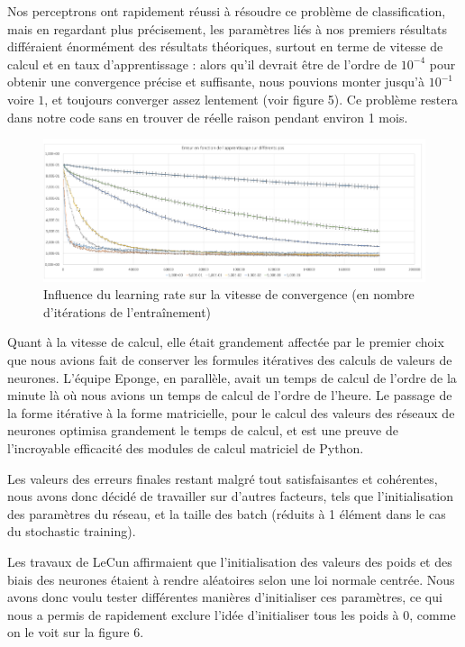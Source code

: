 \documentclass[
    10pt,
    a4paper,
    oneside,
    headinclude,footinclude,
    BCOR=5mm,
    captions=tableabove
]{scrartcl}
\begin{document}
Nos perceptrons ont rapidement réussi à résoudre ce problème de classification, mais en regardant plus précisement, les paramètres liés à nos premiers résultats différaient énormément des résultats théoriques, surtout en terme de vitesse de calcul et en taux d'apprentissage : alors qu'il devrait être de l'ordre de $10^{-4}$ pour obtenir une convergence précise et suffisante, nous pouvions monter jusqu'à $10^{-1}$ voire $1$, et toujours converger assez lentement (voir figure 5). Ce problème restera dans notre code sans en trouver de réelle raison pendant environ 1 mois.

\begin{figure}[h!]
\includegraphics[width=\linewidth]{errorRate.png}
\centering
\caption{Influence du learning rate sur la vitesse de convergence (en nombre d'itérations de l'entraînement) }
\label{fig:errorRate.png}
\end{figure}

Quant à la vitesse de calcul, elle était grandement affectée par le premier choix que nous avions fait de conserver les formules itératives des calculs de valeurs de neurones. L'équipe Eponge, en parallèle, avait un temps de calcul de l'ordre de la minute là où nous avions un temps de calcul de l'ordre de l'heure. Le passage de la forme itérative à la forme matricielle, pour le calcul des valeurs des réseaux de neurones optimisa grandement le temps de calcul, et est une preuve de l'incroyable efficacité des modules de calcul matriciel de Python. 

Les valeurs des erreurs finales restant malgré tout satisfaisantes et cohérentes, nous avons donc décidé de travailler sur d'autres facteurs, tels que l'initialisation des paramètres du réseau, et la taille des batch (réduits à 1 élément dans le cas du stochastic training).

Les travaux de LeCun affirmaient que l'initialisation des valeurs des poids et des biais des neurones étaient à rendre aléatoires selon une loi normale centrée. Nous avons donc voulu tester différentes manières d'initialiser ces paramètres, ce qui nous a permis de rapidement exclure l'idée d'initialiser tous les poids à $0$, comme on le voit sur la figure 6. 
\end{document}
